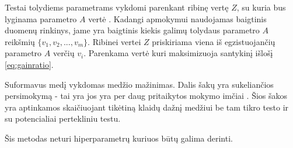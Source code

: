  Testai tolydiems parametrams vykdomi parenkant ribinę vertę $Z$, su kuria bus lyginama parametro $A$ vertė \cite{c45}. Kadangi apmokymui naudojamas baigtinis duomenų rinkinys, jame yra baigtinis kiekis galimų tolydaus parametro $A$ reikšmių $\{v_1, v_2, ..., v_m\}$. Ribinei vertei $Z$ priskiriama viena iš egzistuojančių parametro $A$ verčių  $v_i$. Parenkama vertė kuri maksimizuoja santykinį išlošį \ref{eq:gainratio}.

Suformavus medį vykdomas medžio mažinimas. Dalis šakų yra sukeliančios persimokymą - tai yra jos yra per daug pritaikytos mokymo imčiai \cite{c45}. Šios šakos yra aptinkamos skaičiuojant tikėtiną klaidų dažnį medžiui be tam tikro testo ir su potencialiai pertekliniu testu.

Šis metodas neturi hiperparametrų kuriuos būtų galima derinti.
